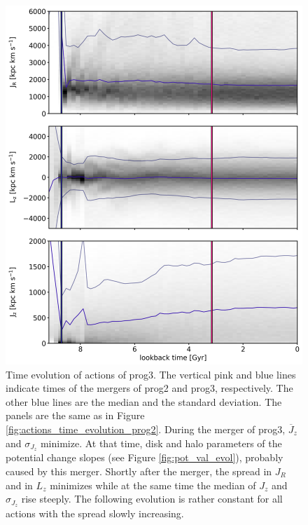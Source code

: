 \begin{figure}
\captionsetup{format=plain}
\centering
\includegraphics[width=\textwidth]{plots/Dynamics/prog3/action_time_evolution_wodisk_hist_mean.png}
\caption{Time evolution of actions of prog3. The vertical pink and blue lines indicate times of the mergers of prog2 and prog3, respectively. The other blue lines are the median and the standard deviation. The panels are the same as in Figure \ref{fig:actions_time_evolution_prog2}. During the merger of prog3, $\overline{J}_z$ and $\sigma{_J_z}$ minimize. At that time, disk and halo parameters of the potential change slopes (see Figure \ref{fig:pot_val_evol}), probably caused by this merger. Shortly after the merger, the spread in $J_R$ and in $L_z$ minimizes while at the same time the median of $J_z$ and $\sigma{_J_z}$ rise steeply. The following evolution is rather constant for all actions with the spread slowly increasing.}\label{fig:actions_time_evolution_prog3}
\end{figure}

